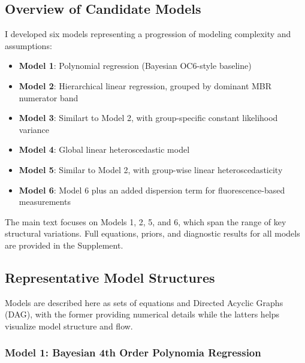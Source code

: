 \documentclass[
]{agujournal2019}
\providecommand{\tightlist}{%
  \setlength{\itemsep}{0pt}\setlength{\parskip}{0pt}}\usepackage{longtable,booktabs,array}
\begin{document}
\subsection{Overview of Candidate
Models}\label{overview-of-candidate-models}

I developed six models representing a progression of modeling complexity
and assumptions:

\begin{itemize}
\tightlist
\item
  \textbf{Model 1}: Polynomial regression (Bayesian OC6-style
  baseline)\\
\item
  \textbf{Model 2}: Hierarchical linear regression, grouped by dominant
  MBR numerator band\\
\item
  \textbf{Model 3}: Similart to Model 2, with group-specific constant
  likelihood variance\\
\item
  \textbf{Model 4}: Global linear heteroscedastic model\\
\item
  \textbf{Model 5}: Similar to Model 2, with group-wise linear
  heteroscedasticity\\
\item
  \textbf{Model 6}: Model 6 plus an added dispersion term for
  fluorescence-based measurements
\end{itemize}

The main text focuses on Models 1, 2, 5, and 6, which span the range of
key structural variations. Full equations, priors, and diagnostic
results for all models are provided in the Supplement.

\subsection{Representative Model
Structures}\label{representative-model-structures}

Models are described here as sets of equations and Directed Acyclic
Graphs (DAG), with the former providing numerical details while the
latters helps visualize model structure and flow.

\subsubsection{Model 1: Bayesian 4th Order Polynomia
Regression}\label{model-1-bayesian-4th-order-polynomia-regression}
\end{document}
